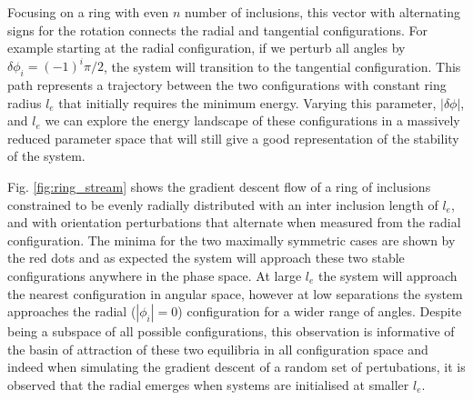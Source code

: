 Focusing on a ring with even $n$ number of inclusions, this vector with alternating signs for the rotation connects the radial and tangential configurations. For example starting at the radial configuration, if we perturb all angles by $\delta\phi_i = (-1)^{i}\pi/2$, the system will transition to the tangential configuration. This path represents a trajectory between the two configurations with constant ring radius $l_e$ that initially requires the minimum energy. Varying this parameter, $|\delta\phi|$, and $l_e$ we can explore the energy landscape of these configurations in a massively reduced parameter space that will still give a good representation of the stability of the system. 

Fig. \ref{fig:ring_stream} shows the gradient descent flow of a ring of inclusions constrained to be evenly radially distributed with an inter inclusion length of $l_e$, and with orientation perturbations that alternate when measured from the radial configuration. The minima for the two maximally symmetric cases are shown by the red dots and as expected the system will approach these two stable configurations anywhere in the phase space. At large $l_e$ the system will approach the nearest configuration in angular space, however at low separations the system approaches the radial ($|\phi_i|=0$) configuration for a wider range of angles. Despite being a subspace of all possible configurations, this observation is informative of the basin of attraction of these two equilibria in all configuration space and indeed when simulating the gradient descent of a random set of pertubations, it is observed that the radial emerges when systems are initialised at smaller $l_e$.

